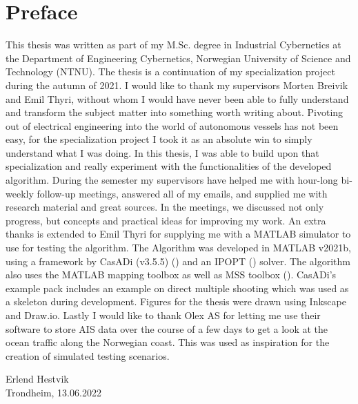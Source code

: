 \newpage

\section*{Preface}

This thesis was written as part of my M.Sc. degree in Industrial Cybernetics
at the Department of Engineering Cybernetics, Norwegian University of Science
and Technology (NTNU). The thesis is a continuation of my specialization project during the autumn of 2021.
I would like to thank my supervisors Morten Breivik and Emil Thyri, without whom I would have
never been able to fully understand and transform the subject matter into something worth writing about.\newline
Pivoting out of electrical engineering into the world of autonomous vessels has not been easy, for
the specialization project I took it as an absolute win to simply understand what I was doing. In this 
thesis, I was able to build upon that specialization and really experiment with the functionalities of the developed
algorithm.\newline
During the semester my supervisors have helped me with hour-long bi-weekly follow-up meetings, answered
all of my emails, and supplied me with research material and great sources. In the meetings, we discussed
not only progress, but concepts and practical ideas for improving my work.\newline
An extra thanks is extended to Emil Thyri for supplying me with a MATLAB simulator to use for testing the algorithm.
The Algorithm was developed in MATLAB v2021b, using a framework by CasADi (v3.5.5) (\cite{andersson2019casadi}) and an IPOPT (\cite{wachter2006implementation}) solver. The algorithm
also uses the MATLAB mapping toolbox as well as MSS toolbox (\cite{MSStoolbox}). CasADi's example pack includes an example on 
direct multiple shooting which was used as a skeleton during development. Figures for the thesis were drawn
using Inkscape and Draw.io. Lastly I would like to thank Olex AS for letting me use their software to store AIS data
over the course of a few days to get a look at the ocean traffic along the Norwegian coast. This was used as inspiration
for the creation of simulated testing scenarios.


\begin{center}
    Erlend Hestvik\\
    Trondheim, 13.06.2022
\end{center}

\afterpage{\blankpage}